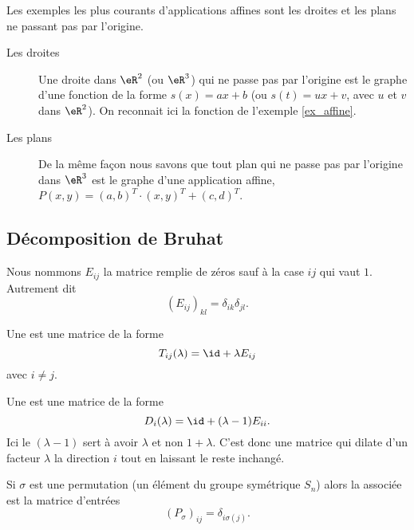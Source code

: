 \begin{example}
	Les exemples les plus courants d'applications affines sont les droites et les plans ne passant pas par l'origine.
	\begin{description}
		\item[Les droites] Une droite dans $\eR^2$ (ou $\eR^3$) qui ne passe pas par l'origine est le graphe d'une fonction de la forme $s(x)=ax+b$ (ou $s(t)=u x +v$, avec $u$ et $v$  dans $\eR^2$). On reconnait ici la fonction de l'exemple \ref{ex_affine}.
			
		\item[Les plans]
			De la même façon nous savons que tout plan qui ne passe pas par l'origine dans $\eR^3$ est le graphe d'une application affine, $P(x,y)= (a,b)^T\cdot(x,y)^T+(c,d)^T$.
	\end{description}
\end{example}

\subsection{Décomposition de Bruhat}

Nous nommons \( E_{ij}\) la matrice remplie de zéros sauf à la case \( ij\) qui vaut \( 1\). Autrement dit
\begin{equation}
    (E_{ij})_{kl}=\delta_{ik}\delta_{jl}.
\end{equation}
\begin{definition}
    Une  est une matrice de la forme
    \begin{equation}
        T_{ij}(\lambda)=\id+\lambda E_{ij}
    \end{equation}
    avec \( i\neq j\).

    Une  est une matrice de la forme
    \begin{equation}
        D_i(\lambda)=\id+(\lambda-1)E_{ii}.
    \end{equation}
    Ici le \( (\lambda-1)\) sert à avoir \( \lambda\) et non \( 1+\lambda\). C'est donc une matrice qui dilate d'un facteur \( \lambda\) la direction \( i\) tout en laissant le reste inchangé.

    Si \( \sigma\) est une permutation (un élément du groupe symétrique \( S_n\)) alors la  associée est la matrice d'entrées
    \begin{equation}
        (P_{\sigma})_{ij}=\delta_{i\sigma(j)}.
    \end{equation}
\end{definition}

